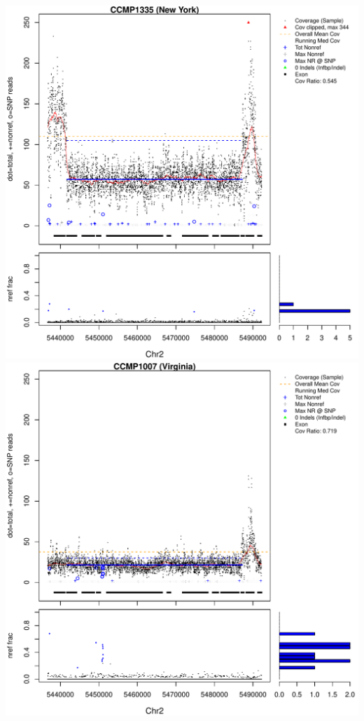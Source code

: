 \documentclass{article}\usepackage[]{graphicx}\usepackage[]{color}
\makeatletter
\def\maxwidth{ %
  \ifdim\Gin@nat@width>\linewidth
    \linewidth
  \else
    \Gin@nat@width
  \fi
}
\newenvironment{knitrout}{}{} %
\makeatother
\begin{document}
\begin{knitrout}
{\centering \includegraphics[width=\maxwidth]{figs-knitr/unnamed-chunk-35-1} 
\includegraphics[width=\maxwidth]{figs-knitr/unnamed-chunk-35-2} 
}
\end{knitrout}
\end{document}
